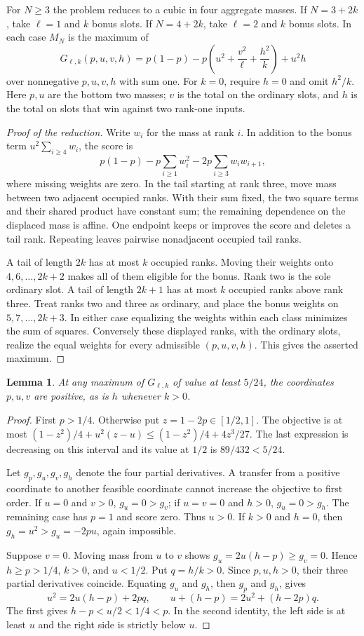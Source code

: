 \documentclass[11pt]{article}
\newtheorem{lemma}[theorem]{Lemma}
\begin{document}
For $N\ge3$ the problem reduces to a cubic in four aggregate masses.
If $N=3+2k$, take $\ell=1$ and $k$ bonus slots. If $N=4+2k$,
take $\ell=2$ and $k$ bonus slots. In each case $M_N$ is the maximum of
\[
 G_{\ell,k}(p,u,v,h)
 =p(1-p)-p\left(u^2+\frac{v^2}{\ell}+\frac{h^2}{k}\right)+u^2h
\]
over nonnegative $p,u,v,h$ with sum one. For $k=0$, require $h=0$ and
omit $h^2/k$. Here $p,u$ are the bottom two masses; $v$ is the total on
the ordinary slots, and $h$ is the total on slots that win against
two rank-one inputs.

\begin{proof}[Proof of the reduction]
Write $w_i$ for the mass at rank $i$. In addition to the bonus term
$u^2\sum_{i\ge4}w_i$, the score is
\[
 p(1-p)-p\sum_{i\ge1}w_i^2-2p\sum_{i\ge3}w_iw_{i+1},
\]
where missing weights are zero. In the tail starting at rank three,
move mass between two adjacent occupied ranks. With their sum fixed,
the two square terms and their shared product have constant sum; the
remaining dependence on the displaced mass is affine. One endpoint
keeps or improves the score and deletes a tail rank. Repeating leaves
pairwise nonadjacent occupied tail ranks.

A tail of length $2k$ has at most $k$ occupied ranks. Moving their
weights onto $4,6,\ldots,2k+2$ makes all of them eligible for the
bonus. Rank two is the sole ordinary slot. A tail of length $2k+1$
has at most $k$ occupied ranks above rank three. Treat ranks two and
three as ordinary, and place the bonus weights on
$5,7,\ldots,2k+3$. In either case equalizing the weights within each
class minimizes the sum of squares. Conversely these displayed ranks,
with the ordinary slots, realize the equal weights for every admissible
$(p,u,v,h)$. This gives the asserted maximum.
\end{proof}

\begin{lemma}
At any maximum of $G_{\ell,k}$ of value at least $5/24$,
the coordinates $p,u,v$ are positive, as is $h$ whenever $k>0$.
\end{lemma}
\begin{proof}
First $p>1/4$. Otherwise put $z=1-2p\in[1/2,1]$. The objective is
at most
$(1-z^2)/4+u^2(z-u)\le(1-z^2)/4+4z^3/27$.
The last expression is decreasing on this interval and its value at
$1/2$ is $89/432<5/24$.

Let $g_p,g_u,g_v,g_h$ denote the four partial derivatives. A transfer
from a positive coordinate to another feasible coordinate cannot
increase the objective to first order. If $u=0$ and $v>0$,
$g_u=0>g_v$; if $u=v=0$ and $h>0$, $g_u=0>g_h$.
The remaining case has $p=1$ and score zero. Thus $u>0$.
If $k>0$ and $h=0$, then $g_h=u^2>g_u=-2pu$, again impossible.

Suppose $v=0$. Moving mass from $u$ to $v$ shows
$g_u=2u(h-p)\ge g_v=0$. Hence $h\ge p>1/4$, $k>0$, and $u<1/2$.
Put $q=h/k>0$. Since $p,u,h>0$, their three partial derivatives
coincide. Equating $g_u$ and $g_h$, then $g_p$ and $g_h$, gives
\[
 u^2=2u(h-p)+2pq,\qquad
 u+(h-p)=2u^2+(h-2p)q .
\]
The first gives $h-p<u/2<1/4<p$. In the second identity, the left
side is at least $u$ and the right side is strictly below $u$.
\end{proof}
\end{document}
